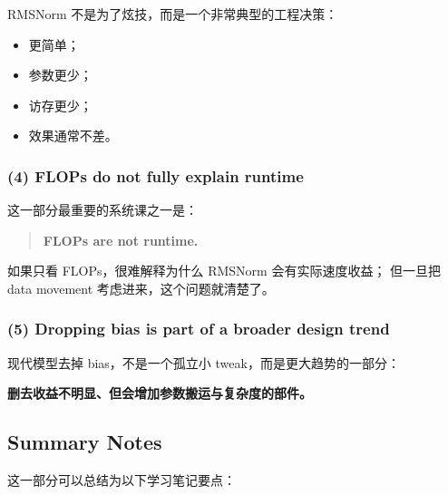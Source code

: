 \documentclass[a4paper,UTF8]{article}
\numberwithin{equation}{section}
\begin{document}
RMSNorm 不是为了炫技，而是一个非常典型的工程决策：
\begin{itemize}
    \item 更简单；
    \item 参数更少；
    \item 访存更少；
    \item 效果通常不差。
\end{itemize}

\subsubsection{(4) FLOPs do not fully explain runtime}

这一部分最重要的系统课之一是：
\begin{quote}
\textbf{FLOPs are not runtime.}
\end{quote}

如果只看 FLOPs，很难解释为什么 RMSNorm 会有实际速度收益；  
但一旦把 data movement 考虑进来，这个问题就清楚了。

\subsubsection{(5) Dropping bias is part of a broader design trend}

现代模型去掉 bias，不是一个孤立小 tweak，而是更大趋势的一部分：
\begin{center}
\textbf{删去收益不明显、但会增加参数搬运与复杂度的部件。}
\end{center}

\subsection{Summary Notes}

这一部分可以总结为以下学习笔记要点：
\end{document}
